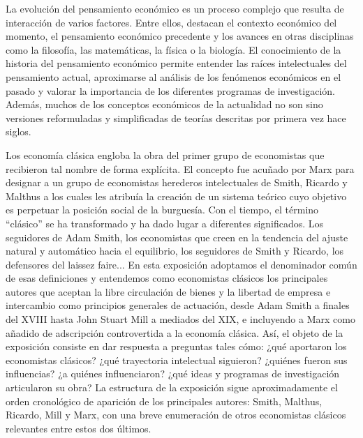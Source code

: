 \documentclass{nuevotema}
\begin{document}
\ideaclave

La evolución del pensamiento económico es un proceso complejo que resulta de interacción de varios factores. Entre ellos, destacan el contexto económico del momento, el pensamiento económico precedente y los avances en otras disciplinas como la filosofía, las matemáticas, la física o la biología. El conocimiento de la historia del pensamiento económico permite entender las raíces intelectuales del pensamiento actual, aproximarse al análisis de los fenómenos económicos en el pasado y valorar la importancia de los diferentes programas de investigación. Además, muchos de los conceptos económicos de la actualidad no son sino versiones reformuladas y simplificadas de teorías descritas por primera vez hace siglos. 

Los economía clásica engloba la obra del primer grupo de economistas que recibieron tal nombre de forma explícita. El concepto fue acuñado por Marx para designar a un grupo de economistas herederos intelectuales de Smith, Ricardo y Malthus a los cuales les atribuía la creación de un sistema teórico cuyo objetivo es perpetuar la posición social de la burguesía. Con el tiempo, el término ``clásico'' se ha transformado y ha dado lugar a diferentes significados. Los seguidores de Adam Smith, los economistas que creen en la tendencia del ajuste natural y automático hacia el equilibrio, los seguidores de Smith y Ricardo, los defensores del laissez faire... En esta exposición adoptamos el denominador común de esas definiciones y entendemos como economistas clásicos los principales autores que aceptan la libre circulación de bienes y la libertad de empresa e intercambio como principios generales de actuación, desde Adam Smith a finales del XVIII hasta John Stuart Mill a mediados del XIX, e incluyendo a Marx como añadido de adscripción controvertida a la economía clásica. Así, el objeto de la exposición consiste en dar respuesta a preguntas tales cómo: ¿qué aportaron los economistas clásicos? ¿qué trayectoria intelectual siguieron? ¿quiénes fueron sus influencias? ¿a quiénes influenciaron? ¿qué ideas y programas de investigación articularon su obra? La estructura de la exposición sigue aproximadamente el orden cronológico de aparición de los principales autores: Smith, Malthus, Ricardo, Mill y Marx, con una breve enumeración de otros economistas clásicos relevantes entre estos dos últimos.
\end{document}
